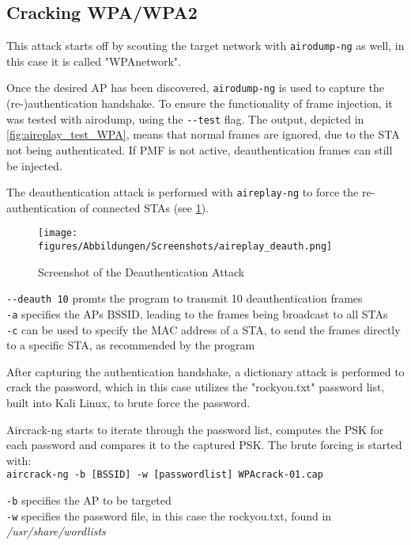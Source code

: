 \newpage
\subsection{Cracking WPA/WPA2}
This attack starts off by scouting the target network with \lstinline[]|airodump-ng| as well, in this case it is called "WPAnetwork".

Once the desired AP has been discovered, \lstinline[]|airodump-ng| is used to capture the (re-)authentication handshake.
To ensure the functionality of frame injection, it was tested with airodump, using the \lstinline[]|--test| flag.
The output, depicted in \cref{fig:aireplay_test_WPA}, means that normal frames are ignored, due to the STA not being authenticated.
If PMF is not active, deauthentication frames can still be injected.

The deauthentication attack is performed with \lstinline[]|aireplay-ng| to force the re-authentication of connected STAs (see \cref{fig:aireplay_deauth}).

\begin{figure}[h]
    \centering
    \texttt{[image: figures/Abbildungen/Screenshots/aireplay\_deauth.png]}
    \caption{Screenshot of the Deauthentication Attack}
    \label{fig:aireplay_deauth}
\end{figure}

\lstinline[]|--deauth 10| promts the program to transmit 10 deauthentication frames
\\\lstinline[]|-a| specifies the APs BSSID, leading to the frames being broadcast to all STAs
\\\lstinline[]|-c| can be used to specify the MAC address of a STA, to send the frames directly to a specific STA, as recommended by the program

After capturing the authentication handshake, a dictionary attack is performed to crack the password, which in this case utilizes the "rockyou.txt" password list, built into Kali Linux, to brute force the password.

Aircrack-ng starts to iterate through the password list, computes the PSK for each password and compares it to the captured PSK.
The brute forcing is started with:
\\\lstinline[]|aircrack-ng -b [BSSID] -w [passwordlist] WPAcrack-01.cap|

\lstinline[]|-b| specifies the AP to be targeted
\\\lstinline[]|-w| specifies the password file, in this case the rockyou.txt, found in \textit{/usr/share/wordlists}


